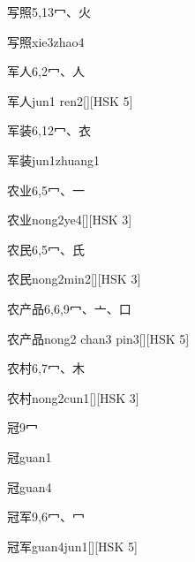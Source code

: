 \begin{entry}{写照}{5,13}{⼍、⽕}
  \begin{phonetics}{写照}{xie3zhao4}
  \end{phonetics}
\end{entry}

\begin{entry}{军人}{6,2}{⼍、⼈}
  \begin{phonetics}{军人}{jun1 ren2}[][HSK 5]
  \end{phonetics}
\end{entry}

\begin{entry}{军装}{6,12}{⼍、⾐}
  \begin{phonetics}{军装}{jun1zhuang1}
  \end{phonetics}
\end{entry}

\begin{entry}{农业}{6,5}{⼍、⼀}
  \begin{phonetics}{农业}{nong2ye4}[][HSK 3]
  \end{phonetics}
\end{entry}

\begin{entry}{农民}{6,5}{⼍、⽒}
  \begin{phonetics}{农民}{nong2min2}[][HSK 3]
  \end{phonetics}
\end{entry}

\begin{entry}{农产品}{6,6,9}{⼍、⼇、⼝}
  \begin{phonetics}{农产品}{nong2 chan3 pin3}[][HSK 5]
  \end{phonetics}
\end{entry}

\begin{entry}{农村}{6,7}{⼍、⽊}
  \begin{phonetics}{农村}{nong2cun1}[][HSK 3]
  \end{phonetics}
\end{entry}

\begin{entry}{冠}{9}{⼍}
  \begin{phonetics}{冠}{guan1}
  \end{phonetics}
  \begin{phonetics}{冠}{guan4}
  \end{phonetics}
\end{entry}

\begin{entry}{冠军}{9,6}{⼍、⼍}
  \begin{phonetics}{冠军}{guan4jun1}[][HSK 5]
  \end{phonetics}
\end{entry}


